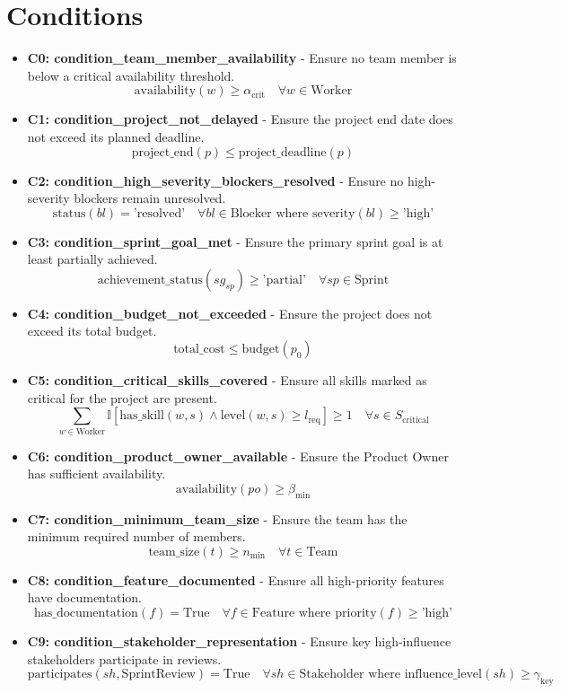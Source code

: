 \documentclass[11pt]{article}
\begin{document}
\section{Conditions}
\begin{itemize}
    \item \textbf{C0: condition\_team\_member\_availability} - Ensure no team member is below a critical availability threshold.
        \[ \text{availability}(w) \geq \alpha_{\text{crit}} \quad \forall w \in \text{Worker} \]
    \item \textbf{C1: condition\_project\_not\_delayed} - Ensure the project end date does not exceed its planned deadline.
        \[ \text{project\_end}(p) \leq \text{project\_deadline}(p) \]
    \item \textbf{C2: condition\_high\_severity\_blockers\_resolved} - Ensure no high-severity blockers remain unresolved.
        \[ \text{status}(bl) = \text{'resolved'} \quad \forall bl \in \text{Blocker} \text{ where } \text{severity}(bl) \geq \text{'high'} \]
    \item \textbf{C3: condition\_sprint\_goal\_met} - Ensure the primary sprint goal is at least partially achieved.
        \[ \text{achievement\_status}(sg_{sp}) \geq \text{'partial'} \quad \forall sp \in \text{Sprint} \]
    \item \textbf{C4: condition\_budget\_not\_exceeded} - Ensure the project does not exceed its total budget.
        \[ \text{total\_cost} \leq \text{budget}(p_0) \]
    \item \textbf{C5: condition\_critical\_skills\_covered} - Ensure all skills marked as critical for the project are present.
        \[ \sum_{w \in \text{Worker}} \mathbb{I}[\text{has\_skill}(w, s) \wedge \text{level}(w, s) \geq l_{\text{req}}] \geq 1 \quad \forall s \in S_{\text{critical}} \]
    \item \textbf{C6: condition\_product\_owner\_available} - Ensure the Product Owner has sufficient availability.
        \[ \text{availability}(po) \geq \beta_{\text{min}} \]
    \item \textbf{C7: condition\_minimum\_team\_size} - Ensure the team has the minimum required number of members.
        \[ \text{team\_size}(t) \geq n_{\text{min}} \quad \forall t \in \text{Team} \]
    \item \textbf{C8: condition\_feature\_documented} - Ensure all high-priority features have documentation.
        \[ \text{has\_documentation}(f) = \text{True} \quad \forall f \in \text{Feature} \text{ where } \text{priority}(f) \geq \text{'high'} \]
    \item \textbf{C9: condition\_stakeholder\_representation} - Ensure key high-influence stakeholders participate in reviews.
        \[ \text{participates}(sh, \text{SprintReview}) = \text{True} \quad \forall sh \in \text{Stakeholder} \text{ where } \text{influence\_level}(sh) \geq \gamma_{\text{key}} \]
\end{itemize}
\end{document}
